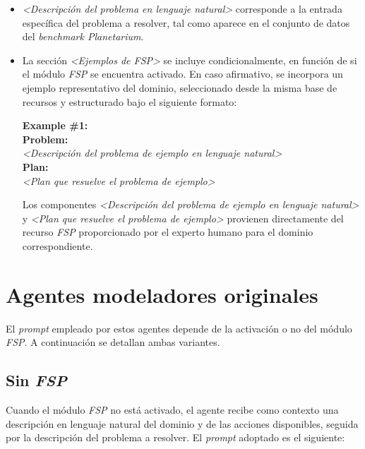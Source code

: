 \begin{anexes}
\begin{itemize}
    \item \textit{<Descripción del problema en lenguaje natural>} corresponde a la entrada específica del problema a resolver, tal como aparece en el conjunto de datos del \textit{benchmark Planetarium}.

    \item La sección \textit{<Ejemplos de FSP>} se incluye condicionalmente, en función de si el módulo \textit{FSP} se encuentra activado. En caso afirmativo, se incorpora un ejemplo representativo del dominio, seleccionado desde la misma base de recursos y estructurado bajo el siguiente formato:

\begin{tcolorbox}[colback=gray!10!white, colframe=black, title=Ejemplo incluido con \textit{FSP}, fonttitle=\bfseries, breakable]
\textbf{Example \#1:} \\
\textbf{Problem:} \\
\textit{<Descripción del problema de ejemplo en lenguaje natural>} \\

\textbf{Plan:} \\
\textit{<Plan que resuelve el problema de ejemplo>}
\end{tcolorbox}

    Los componentes \textit{<Descripción del problema de ejemplo en lenguaje natural>} y \textit{<Plan que resuelve el problema de ejemplo>} provienen directamente del recurso \textit{FSP} proporcionado por el experto humano para el dominio correspondiente.
\end{itemize}

\section*{Agentes modeladores originales}

El \textit{prompt} empleado por estos agentes depende de la activación o no del módulo \textit{FSP}. A continuación se detallan ambas variantes.

\subsection*{Sin \textit{FSP}}

Cuando el módulo \textit{FSP} no está activado, el agente recibe como contexto una descripción en lenguaje natural del dominio y de las acciones disponibles, seguida por la descripción del problema a resolver. El \textit{prompt} adoptado es el siguiente:


\end{anexes}
